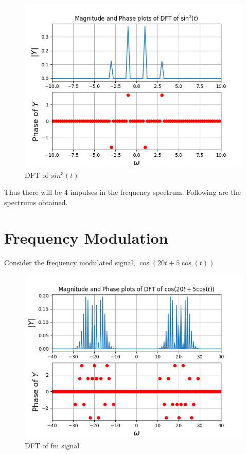 \documentclass[11pt, a4paper]{article}
\begin{document}
 \begin{figure}[!tbh]
   	\centering
   	\includegraphics[scale=0.5]{figure0.png}  %
   	\caption{DFT of $sin^3(t)$}
   	\label{fig:sample}
   \end{figure} 
Thus there will be 4 impulses in the frequency spectrum. Following are the spectrums obtained.

\newpage
\section{Frequency Modulation}
Consider the frequency modulated signal, $\cos(20t + 5\cos(t))$
\begin{figure}[!tbh]
   	\centering
   	\includegraphics[scale=0.5]{figure2.png}  %
   	\caption{DFT of fm signal}
   	\label{fig:sample}
   \end{figure} 
   
\end{document}
